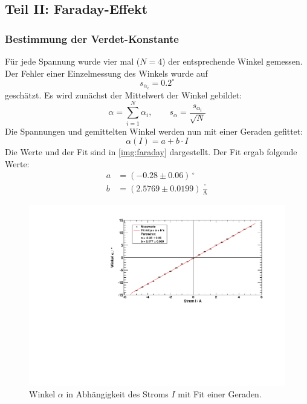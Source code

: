 \subsection{Teil II: Faraday-Effekt}
\subsubsection{Bestimmung der Verdet-Konstante}
Für jede Spannung wurde vier mal ($N=4$) der entsprechende Winkel gemessen. Der Fehler einer Einzelmessung des Winkels wurde auf
\begin{equation}
  s_{\alpha_i} = 0.2^\circ
\end{equation}  %
geschätzt. Es wird zunächst der Mittelwert der Winkel gebildet:
\begin{equation}
  \alpha = \sum_{i=1}^{N} \alpha_i, \qquad s_{\alpha} = \frac{s_{\alpha_i}}{\sqrt{N}}
\end{equation}
Die Spannungen und gemittelten Winkel werden nun mit einer Geraden gefittet:
\begin{equation}
  \alpha(I) = a + b \cdot I
\end{equation}
Die Werte und der Fit sind in \autoref{img:faraday} dargestellt. Der Fit ergab folgende Werte:
\begin{equation}
\begin{split}
  \label{eq:faraday:params}
  a &= (-0.28 \pm 0.06)\,{}^\circ \\
  b &= (2.5769 \pm 0.0199)\,\frac{{}^\circ}{\text{A}}
\end{split}
\end{equation}
\begin{figure}[H]
\begin{center}
  \includegraphics[width=\textwidth]{../img/faraday.pdf}
  \caption{Winkel $\alpha$ in Abhängigkeit des Stroms $I$ mit Fit einer Geraden.}
  \label{img:faraday}
\end{center}
\end{figure}
